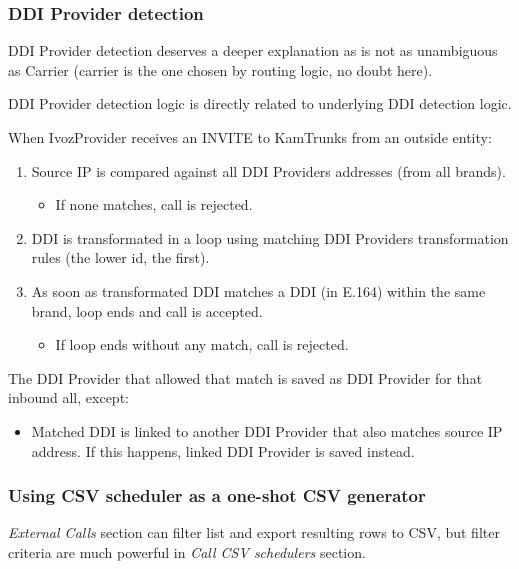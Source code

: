 \documentclass[letterpaper,10pt,english]{sphinxmanual}
\begin{document}
\subsubsection{DDI Provider detection}
\label{administration_portal/brand/calls/call_csv_schedulers:ddi-provider-detection}
DDI Provider detection deserves a deeper explanation as is not as unambiguous as Carrier (carrier is the one chosen by
routing logic, no doubt here).

DDI Provider detection logic is directly related to underlying DDI detection logic.

When IvozProvider receives an INVITE to KamTrunks from an outside entity:
\begin{enumerate}
\item {} 
Source IP is compared against all DDI Providers addresses (from all brands).
\begin{itemize}
\item {} 
If none matches, call is rejected.

\end{itemize}

\item {} 
DDI is transformated in a loop using matching DDI Providers transformation rules (the lower id, the first).

\item {} 
As soon as transformated DDI matches a DDI (in E.164) within the same brand, loop ends and call is accepted.
\begin{itemize}
\item {} 
If loop ends without any match, call is rejected.

\end{itemize}

\end{enumerate}

The DDI Provider that allowed that match is saved as DDI Provider for that inbound all, except:
\begin{itemize}
\item {} 
Matched DDI is linked to another DDI Provider that also matches source IP address. If this happens, linked DDI Provider
is saved instead.

\end{itemize}


\subsubsection{Using CSV scheduler as a one-shot CSV generator}
\label{administration_portal/brand/calls/call_csv_schedulers:using-csv-scheduler-as-a-one-shot-csv-generator}
\emph{External Calls} section can filter list and export resulting rows to CSV, but filter criteria are much powerful in
\emph{Call CSV schedulers} section.
\end{document}
